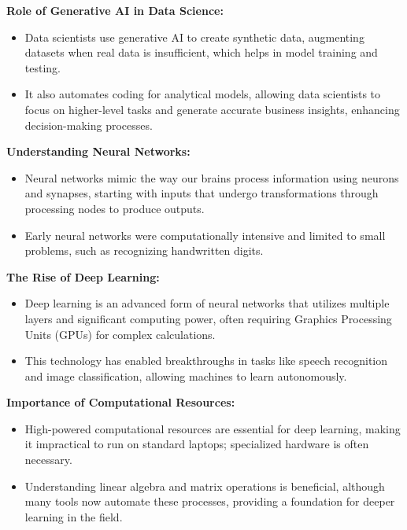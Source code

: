\documentclass[12pt]{report} %
\begin{document}
		\noindent \textbf{Role of Generative AI in Data Science:}
		\begin{itemize}
			\item Data scientists use generative AI to create synthetic data, augmenting datasets when real data is insufficient, which helps in model training and testing.
			\item It also automates coding for analytical models, allowing data scientists to focus on higher-level tasks and generate accurate business insights, enhancing decision-making processes.
		\end{itemize}
		
		\noindent \textbf{Understanding Neural Networks:}
		\begin{itemize}
			\item Neural networks mimic the way our brains process information using neurons and synapses, starting with inputs that undergo transformations through processing nodes to produce outputs.
			\item Early neural networks were computationally intensive and limited to small problems, such as recognizing handwritten digits.
		\end{itemize}
		
		\noindent \textbf{The Rise of Deep Learning:}
		\begin{itemize}
			\item Deep learning is an advanced form of neural networks that utilizes multiple layers and significant computing power, often requiring Graphics Processing Units (GPUs) for complex calculations.
			\item This technology has enabled breakthroughs in tasks like speech recognition and image classification, allowing machines to learn autonomously.
		\end{itemize}
		
		\noindent \textbf{Importance of Computational Resources:}
		\begin{itemize}
			\item High-powered computational resources are essential for deep learning, making it impractical to run on standard laptops; specialized hardware is often necessary.
			\item Understanding linear algebra and matrix operations is beneficial, although many tools now automate these processes, providing a foundation for deeper learning in the field.
		\end{itemize}
		
\end{document}
